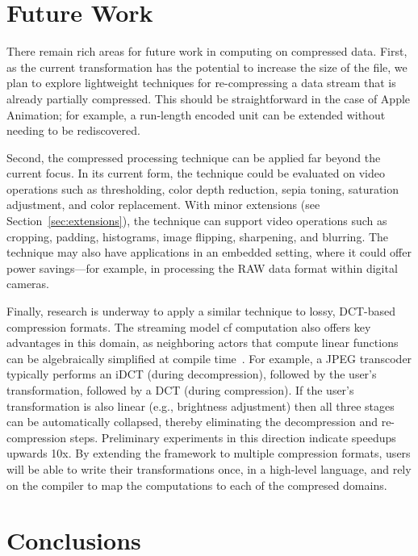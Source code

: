 \section{Future Work}

There remain rich areas for future work in computing on compressed
data.  First, as the current transformation has the potential to
increase the size of the file, we plan to explore lightweight
techniques for re-compressing a data stream that is already partially
compressed.  This should be straightforward in the case of Apple
Animation; for example, a run-length encoded unit can be extended
without needing to be rediscovered.

Second, the compressed processing technique can be applied far beyond
the current focus.  In its current form, the technique could be
evaluated on video operations such as thresholding, color depth
reduction, sepia toning, saturation adjustment, and color replacement.
With minor extensions (see Section~\ref{sec:extensions}), the
technique can support video operations such as cropping, padding,
histograms, image flipping, sharpening, and blurring.  The technique
may also have applications in an embedded setting, where it could
offer power savings---for example, in processing the RAW data format
within digital cameras.

Finally, research is underway to apply a similar technique to lossy,
DCT-based compression formats.  The streaming model cf computation
also offers key advantages in this domain, as neighboring actors that
compute linear functions can be algebraically simplified at compile
time~\cite{aalamb}.  For example, a JPEG transcoder typically performs
an iDCT (during decompression), followed by the user's transformation,
followed by a DCT (during compression).  If the user's transformation
is also linear (e.g., brightness adjustment) then all three stages can
be automatically collapsed, thereby eliminating the decompression and
re-compression steps.  Preliminary experiments in this direction
indicate speedups upwards 10x.  By extending the framework to multiple
compression formats, users will be able to write their transformations
once, in a high-level language, and rely on the compiler to map the
computations to each of the compresed domains.

\section{Conclusions}
\label{sec:conclusions}


